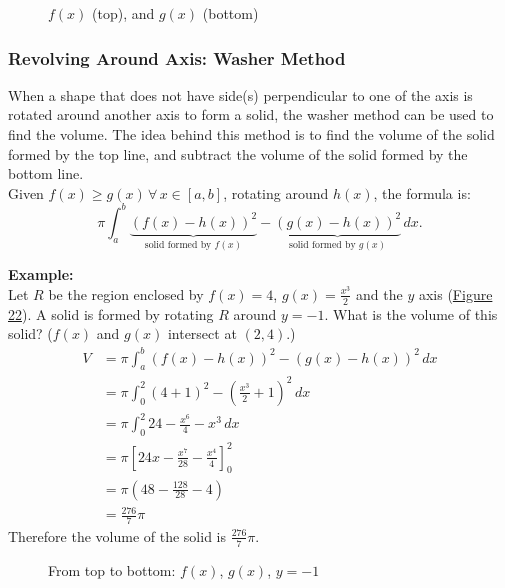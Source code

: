 \documentclass[12pt]{article}
\begin{document}
\begin{figure}[H]
    \begin{center}
        \caption{$f(x)$ (top), and $g(x)$ (bottom)}
        \label{fig:disc}
    \end{center}
\end{figure}

\subsubsection{Revolving Around Axis: Washer Method}
When a shape that does not have side(s) perpendicular to one of the axis is rotated around another axis to form a solid, the washer method can be used to find the volume. The idea behind this method is to find the volume of the solid formed by the top line, and subtract the volume of the solid formed by the bottom line.
\\ Given $f(x) \ge g(x) \, \forall \, x \in [a, b]$, rotating around $h(x)$, the formula is:
\[ \pi \int_a^b \underbrace{\left( f(x) - h(x) \right)^2}_{\text{solid formed by $f(x)$}} - \underbrace{\left( g(x) - h(x) \right)^2}_{\text{solid formed by $g(x)$}} \, dx.\]

\noindent \textbf{Example:}
\\ Let $R$ be the region enclosed by $f(x) = 4$, $g(x) = \frac{x^3}{2}$ and the $y$ axis (\hyperref[fig:washer]{Figure 22}). A solid is formed by rotating $R$ around $y=-1$. What is the volume of this solid? ($f(x)$ and $g(x)$ intersect at $(2, 4)$.)
\begin{align*}
    V & = \pi \int_a^b \left( f(x) - h(x) \right)^2 - \left( g(x) - h(x) \right)^2 \, dx \\
      & = \pi \int_0^2 (4+1)^2 - \left( \frac{x^3}{2} + 1 \right)^2 \, dx                \\[6pt]
      & = \pi \int_0^2 24 - \frac{x^6}{4} - x^3 \, dx                                    \\[6pt]
      & = \pi \left[ 24x - \frac{x^7}{28} - \frac{x^4}{4} \right]_0^2                    \\[6pt]
      & = \pi \left( 48 - \frac{128}{28} - 4 \right)                                     \\[6pt]
      & = \frac{276}{7} \pi
\end{align*}
Therefore the volume of the solid is $\frac{276}{7} \pi$.

\begin{figure}[H]
    \begin{center}
        \caption{From top to bottom: $f(x)$, $g(x)$, $y=-1$}
        \label{fig:washer}
    \end{center}
\end{figure}
\end{document}
